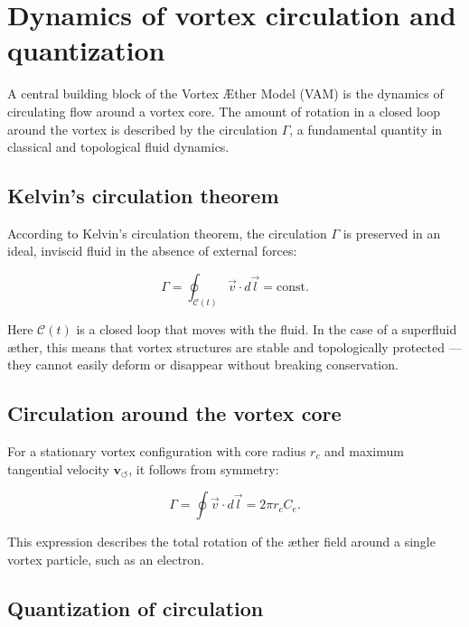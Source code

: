 \section{Dynamics of vortex circulation and quantization}\label{sec:appendix:4}

A central building block of the Vortex Æther Model (VAM) is the dynamics of circulating flow around a vortex core. The amount of rotation in a closed loop around the vortex is described by the circulation \( \Gamma \), a fundamental quantity in classical and topological fluid dynamics.

\subsection{Kelvin's circulation theorem}

According to Kelvin's circulation theorem, the circulation \( \Gamma \) is preserved in an ideal, inviscid fluid in the absence of external forces:

\begin{equation}
    \Gamma = \oint_{\mathcal{C}(t)} \vec{v} \cdot d\vec{l} = \text{const.}
\end{equation}

Here \( \mathcal{C}(t) \) is a closed loop that moves with the fluid. In the case of a superfluid æther, this means that vortex structures are stable and topologically protected — they cannot easily deform or disappear without breaking conservation.

\subsection{Circulation around the vortex core}

For a stationary vortex configuration with core radius \( r_c \) and maximum tangential velocity \( \mathbf{v}_{\scriptscriptstyle\boldsymbol{\circlearrowleft}} \), it follows from symmetry:

\begin{equation}
    \Gamma = \oint \vec{v} \cdot d\vec{l} = 2\pi r_c C_e.
\end{equation}

This expression describes the total rotation of the æther field around a single vortex particle, such as an electron.

\subsection{Quantization of circulation}


